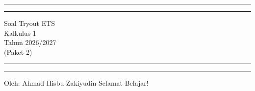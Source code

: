 \documentclass[10pt,openany,a4paper]{article}
\theoremstyle{definition}
\theoremstyle{definition}
\theoremstyle{plain}
\begin{document}
\begin{titlepage}
	\centering %
	\vspace*{1.5\baselineskip} %

	\rule{13cm}{1.6pt}\vspace*{-\baselineskip}\vspace*{2pt} %
	\rule{13cm}{0.4pt} %
	
		\vspace{0.75\baselineskip} %
	{	\Huge Soal Tryout ETS\\ 
			\vspace{4mm}
		Kalkulus 1 \\ \vspace{2mm} \huge{Tahun 2026/2027}\\ \vspace{2mm} \Large{(Paket 2)}\\	}
		\vspace{0.75\baselineskip} %
	\rule{13cm}{0.4pt}\vspace*{-\baselineskip}\vspace{3.2pt} %
	\rule{13cm}{1.6pt} %
	
		\vspace{1.75\baselineskip} %
{\large Oleh: Ahmad Hisbu Zakiyudin}
	\vfill
	\vspace{1mm}
\huge{Selamat Belajar!}
\end{titlepage}
\makeatletter
\setlength\fboxsep{3pt}
\setlength{\headheight}{24pt}
\end{document}
